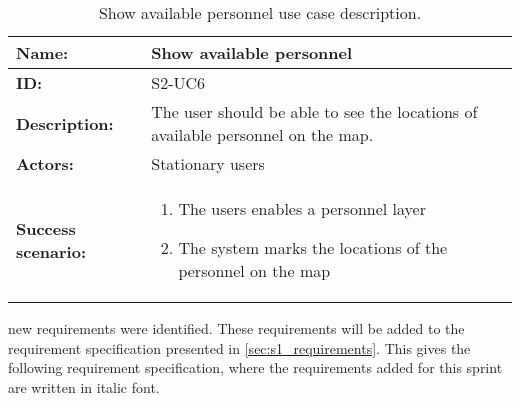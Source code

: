 \begin{table}[h!]
    \centering
    \begin{tabularx}{\textwidth}{|l|X|}
        \hline
        \textbf{Name:}  & Show available personnel \\ \hline
        \textbf{ID:}    & S2-UC6 \\ \hline
        \textbf{Description:} & The user should be able to see the locations of available personnel on the map. \\ \hline
        \textbf{Actors:} & Stationary users \\ \hline
        \textbf{Success scenario:} & 
        \begin{enumerate}
            \item The users enables a personnel layer
            \item The system marks the locations of the personnel on the map
        \end{enumerate}
        \\ \hline
    \end{tabularx}
    \caption{Show available personnel use case description.}
    \label{tab:s2-uc6}
\end{table}


new requirements were identified. These requirements will be added to the requirement specification presented in \cref{sec:s1_requirements}. This gives the following requirement specification, where the requirements added for this sprint are written in italic font.

